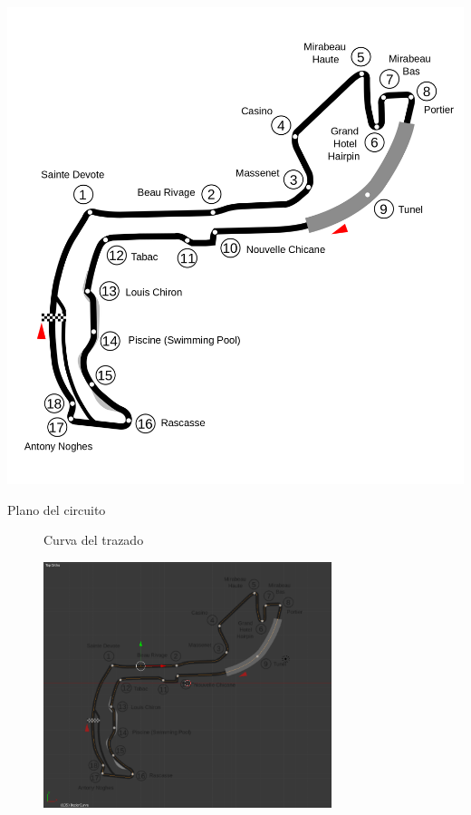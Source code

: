 \documentclass[notes,slidesec,a4]{seminar}
\begin{document}
\begin{hslide}
\begin{minipage}{0.55\textwidth}
		\includegraphics[width=\textwidth]{CircuitoMonaco.png}
		\begin{center}
			Plano del circuito
		\end{center}
	\end{minipage}
\end{hslide}


\begin{hslide}
	\begin{center}
		\begin{figure}
			\begin{center}
				Curva del trazado
			\end{center}
			\includegraphics[width=0.75\textwidth]{MonacoTrazado.png}
		\end{figure}
	\end{center}
\end{hslide}
\end{document}
